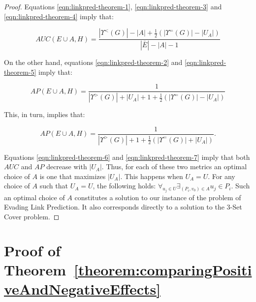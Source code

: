 \documentclass[twocolumn]{article}
\newcommand{\ROC}{\mathit{AUC}}
\newcommand{\AP}{\mathit{AP}}
\newcommand{\ER}{\bar{E}}
\newcommand{\Hide}{H}
\begin{document}
\begin{proof}
\noindent Equations \eqref{eqn:linkpred-theorem-1}, \eqref{eqn:linkpred-theorem-3} and \eqref{eqn:linkpred-theorem-4} imply that:

\begin{equation}
\label{eqn:linkpred-theorem-6}
\ROC(E \cup A, \Hide)=\frac{|\Upsilon^<(G)| - |A| + \frac{1}{2}(|\Upsilon^=(G)|-|U_A|)}{|\ER|-|A|-1}
\end{equation}

\noindent On the other hand, equations \eqref{eqn:linkpred-theorem-2} and \eqref{eqn:linkpred-theorem-5} imply that:

\begin{equation}
\AP(E \cup A,\Hide) = \frac{1}{|\Upsilon^>(G)| + |U_A| + 1 + \frac{1}{2}(|\Upsilon^=(G)|-|U_A|)}
\end{equation}

\noindent This, in turn, implies that:

\begin{equation}
\label{eqn:linkpred-theorem-7}
\AP(E \cup A,\Hide) = \frac{1}{|\Upsilon^>(G)| + 1 + \frac{1}{2}(|\Upsilon^=(G)|+|U_A|)} .
\end{equation}

\noindent Equations \eqref{eqn:linkpred-theorem-6} and \eqref{eqn:linkpred-theorem-7} imply that both $\ROC$ and $\AP$ decrease with $|U_A|$. Thus, for each of these two metrics an optimal choice of $A$ is one that maximizes $|U_A|$. This happens when $U_A=U$. For any choice of $A$ such that $U_A=U$, the following holds: $\forall_{u_j \in U} \exists_{(P_i,v_0) \in A} u_j \in P_i$. Such an optimal choice of $A$ constitutes a solution to our instance of the problem of Evading Link Prediction. It also corresponds directly to a solution to the 3-Set Cover problem.
\end{proof}


\clearpage
\section{Proof of Theorem~\ref{theorem:comparingPositiveAndNegativeEffects}}\label{appendix:proof:theorem:comparingPositiveAndNegativeEffects}
\end{document}
